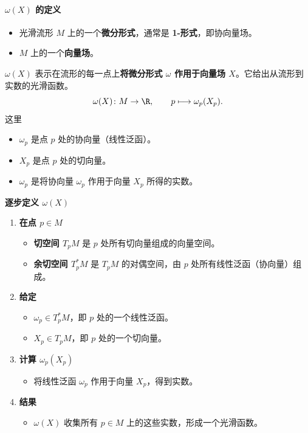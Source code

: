 \paragraph{\texorpdfstring{$\omega(X)$ 的定义}{ω(X) 的定义}}
\begin{itemize}
  \item 光滑流形 $M$ 上的一个\textbf{微分形式}，通常是 \textbf{1-形式}，即协向量场。
  \item $M$ 上的一个\textbf{向量场}。
\end{itemize}
$\omega(X)$ 表示在流形的每一点上\textbf{将微分形式 $\omega$ 作用于向量场 $X$}。它给出从流形到实数的光滑函数。
\[
  \omega(X)\colon M\to\R,\qquad p\longmapsto\omega_p(X_p).
\]
这里
\begin{itemize}
  \item $\omega_p$ 是点 $p$ 处的协向量（线性泛函）。
  \item $X_p$ 是点 $p$ 处的切向量。
  \item $\omega_p$ 是将协向量 $\omega_p$ 作用于向量 $X_p$ 所得的实数。
\end{itemize}

\textbf{逐步定义 $\omega(X)$}
\begin{enumerate}
  \item \textbf{在点 $p\in M$}
  \begin{itemize}
    \item \textbf{切空间 $T_pM$} 是 $p$ 处所有切向量组成的向量空间。
    \item \textbf{余切空间 $T_p^*M$} 是 $T_pM$ 的对偶空间，由 $p$ 处所有线性泛函（协向量）组成。
  \end{itemize}
  \item \textbf{给定}
  \begin{itemize}
    \item $\omega_p\in T_p^*M$，即 $p$ 处的一个线性泛函。
    \item $X_p\in T_pM$，即 $p$ 处的一个切向量。
  \end{itemize}
  \item \textbf{计算 $\omega_p(X_p)$}
  \begin{itemize}
    \item 将线性泛函 $\omega_p$ 作用于向量 $X_p$，得到实数。
  \end{itemize}
  \item \textbf{结果}
  \begin{itemize}
    \item $\omega(X)$ 收集所有 $p\in M$ 上的这些实数，形成一个光滑函数。
  \end{itemize}
\end{enumerate}

